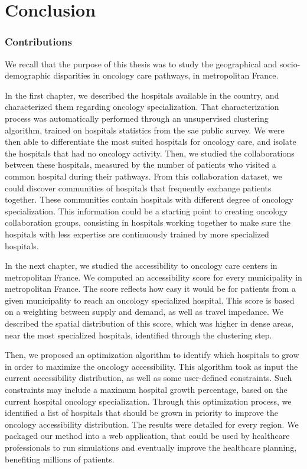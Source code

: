 \chapter*{Conclusion}

\subsection*{Contributions}

We recall that the purpose of this thesis was to study the geographical
and socio-demographic disparities in oncology care pathways, in
metropolitan France.

In the first chapter, we described the hospitals
available in the country, and characterized them regarding oncology
specialization. That characterization process was automatically performed
through an unsupervised clustering algorithm, trained on hospitals statistics
from the \ac{sae} public survey. We were then able to differentiate the
most suited hospitals for oncology care, and isolate the hospitals that had
no oncology activity. Then, we studied the collaborations between these
hospitals, measured by the number of patients who visited a common hospital
during their pathways. From this collaboration dataset, we could discover
communities of hospitals that frequently exchange patients together. These
communities contain hospitals with different degree of oncology specialization.
This information could be a starting point to creating oncology collaboration
groups, consisting in hospitals working together to make sure the hospitals
with less expertise are continuously trained by more specialized hospitals.

In the next chapter, we studied the accessibility to oncology care centers in
metropolitan France. We computed an accessibility score for every municipality
in metropolitan France. The score reflects how easy it would be for patients
from a given municipality to reach an oncology specialized hospital. This score
is based on a weighting between supply and demand, as well as travel impedance.
We described the spatial distribution of this score, which was higher in dense
areas, near the most specialized hospitals, identified through the clustering
step.

Then, we proposed an optimization algorithm to identify which hospitals to grow
in order to maximize the oncology accessibility. This algorithm took as input
the current accessibility distribution, as well as some user-defined
constraints. Such constraints may include a maximum hospital growth percentage,
based on the current hospital oncology specialization. Through this optimization
process, we identified a list of hospitals that should be grown in priority to
improve the oncology accessibility distribution. The results were detailed for
every region. We packaged our method into a web application, that could be used
by healthcare professionals to run simulations and eventually improve the
healthcare planning, benefiting millions of patients.

